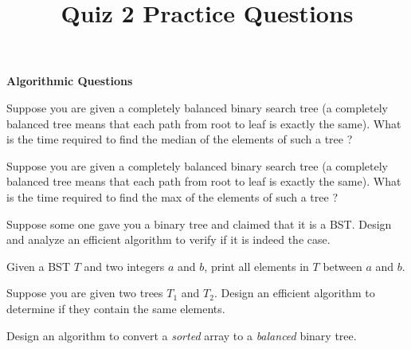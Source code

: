 \documentclass[addpoints,12pt]{exam}
\begin{document}
\title{Quiz 2 Practice Questions}
\author{}
\date{}
\maketitle

\newcommand{\hint}[1]{\\{\bf Hint:} {\em {#1}}}



\begin{center}
{\Large \textbf{Algorithmic Questions}}
\end{center}


\begin{questions}
\question
Suppose you are given a completely balanced binary search tree (a completely balanced tree 
means that each path from root to leaf is exactly the same). What is the time required to find the median
of the elements of such a tree ?

\question
Suppose you are given a completely balanced binary search tree (a completely balanced tree 
means that each path from root to leaf is exactly the same). What is the time required to find the max 
of the elements of such a tree ?

\question
Suppose some one gave you a binary tree and claimed that it is a BST. 
Design and analyze an efficient algorithm to verify if it is indeed the case.

\question
Given a BST $T$ and two integers $a$ and $b$, print all elements in $T$ between $a$ and $b$.

\question
Suppose you are given two trees $T_1$ and $T_2$. Design an efficient algorithm to determine if they contain the same elements.

\question
Design an algorithm to convert a {\em sorted} array to a {\em balanced} binary tree.

\end{questions}
\end{document}
